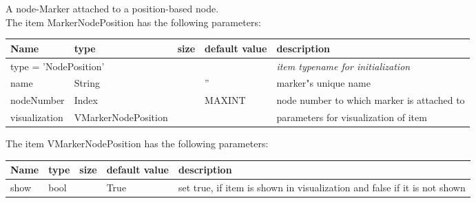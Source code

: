 A node-Marker attached to a position-based node.
 \\The item MarkerNodePosition has the following parameters:
\begin{center}
  \footnotesize
  \begin{longtable}{| p{4.5cm} | p{2.5cm} | p{0.5cm} | p{2.5cm} | p{6cm} |}
    \hline
    \bf Name & \bf type & \bf size & \bf default value & \bf description \\ \hline
    \multicolumn{4}{l}{\parbox{10cm}{type = 'NodePosition'}} & \multicolumn{1}{l}{\parbox{6cm}{\it item typename for initialization}}\\ \hline
    name &     String &      &     '' &     marker"s unique name\\ \hline
    nodeNumber &     Index &      &     MAXINT &     node number to which marker is attached to\\ \hline
    visualization & VMarkerNodePosition & & & parameters for visualization of item \\ \hline
	  \end{longtable}
	\end{center}
The item VMarkerNodePosition has the following parameters:
\begin{center}
  \footnotesize
  \begin{longtable}{| p{4.5cm} | p{2.5cm} | p{0.5cm} | p{2.5cm} | p{6cm} |}
    \hline
    \bf Name & \bf type & \bf size & \bf default value & \bf description \\ \hline
    show &     bool &      &     True &     set true, if item is shown in visualization and false if it is not shown\\ \hline
	  \end{longtable}
	\end{center}

